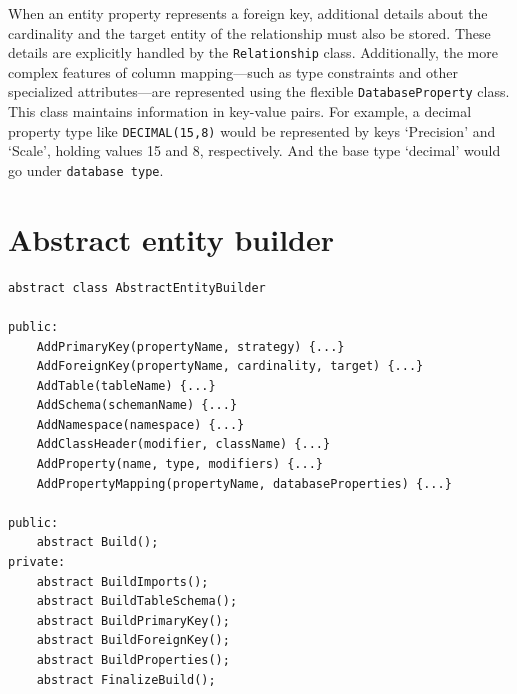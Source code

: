 When an entity property represents a foreign key, additional details about the cardinality and the target entity of the relationship must also be stored. These details are explicitly handled by the \texttt{Relationship} class. Additionally, the more complex features of column mapping---such as type constraints and other specialized attributes---are represented using the flexible \texttt{DatabaseProperty} class. This class maintains information in key-value pairs. For example, a decimal property type like \texttt{DECIMAL(15,8)} would be represented by  keys `Precision' and `Scale', holding values 15 and 8, respectively. And the base type `decimal' would go under \texttt{database type}. 



\section{Abstract entity builder}

 \begin{lstlisting}[caption=AbstractEntityBuilder, language=pseudo]
abstract class AbstractEntityBuilder
    
public: 
    AddPrimaryKey(propertyName, strategy) {...}
    AddForeignKey(propertyName, cardinality, target) {...}
    AddTable(tableName) {...}
    AddSchema(schemanName) {...}
    AddNamespace(namespace) {...}
    AddClassHeader(modifier, className) {...}
    AddProperty(name, type, modifiers) {...}
    AddPropertyMapping(propertyName, databaseProperties) {...}
    
public:
    abstract Build();
private: 
    abstract BuildImports();
    abstract BuildTableSchema();
    abstract BuildPrimaryKey();
    abstract BuildForeignKey();
    abstract BuildProperties();
    abstract FinalizeBuild();
 \end{lstlisting}


